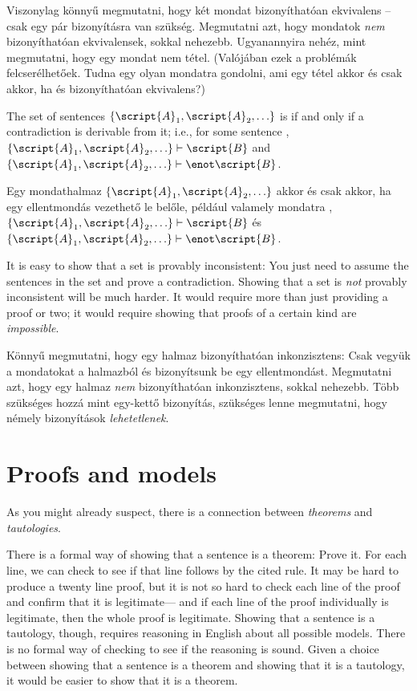 Viszonylag könnyű megmutatni, hogy két mondat bizonyíthatóan ekvivalens -- csak egy pár bizonyításra van szükség. Megmutatni azt, hogy mondatok \emph{nem} bizonyíthatóan ekvivalensek, sokkal nehezebb. Ugyanannyira nehéz, mint megmutatni, hogy egy mondat nem tétel. (Valójában ezek a problémák felcserélhetőek. Tudna egy olyan mondatra gondolni, ami egy tétel akkor és csak akkor, ha  és  bizonyíthatóan ekvivalens?)

The set of sentences $\{\script{A}_1,\script{A}_2,\ldots\}$ is  if and only if a contradiction is derivable from it; i.e., for some sentence , $\{\script{A}_1,\script{A}_2,\ldots\}\vdash\script{B}$ and $\{\script{A}_1,\script{A}_2,\ldots\}\vdash\enot \script{B}$.

Egy mondathalmaz $\{\script{A}_1,\script{A}_2,\ldots\}$  akkor és csak akkor, ha egy ellentmondás vezethető le belőle, például valamely mondatra , $\{\script{A}_1,\script{A}_2,\ldots\}\vdash\script{B}$ és $\{\script{A}_1,\script{A}_2,\ldots\}\vdash\enot \script{B}$.

It is easy to show that a set is provably inconsistent: You just need to assume the sentences in the set and prove a contradiction. Showing that a set is \emph{not} provably inconsistent will be much harder. It would require more than just providing a proof or two; it would require showing that proofs of a certain kind are \emph{impossible}.

Könnyű megmutatni, hogy egy halmaz bizonyíthatóan inkonzisztens: Csak vegyük a mondatokat a halmazból és bizonyítsunk be egy ellentmondást. Megmutatni azt, hogy egy halmaz \emph{nem} bizonyíthatóan inkonzisztens, sokkal nehezebb. Több szükséges hozzá mint egy-kettő bizonyítás, szükséges lenne megmutatni, hogy némely bizonyítások \emph{lehetetlenek}.






\section{Proofs and models}
As you might already suspect, there is a connection between \emph{theorems} and \emph{tautologies}.

There is a formal way of showing that a sentence is a theorem: Prove it. For each line, we can check to see if that line follows by the cited rule. It may be hard to produce a twenty line proof, but it is not so hard to check each line of the proof and confirm that it is legitimate--- and if each line of the proof individually is legitimate, then the whole proof is legitimate. Showing that a sentence is a tautology, though, requires reasoning in English about all possible models. There is no formal way of checking to see if the reasoning is sound. Given a choice between showing that a sentence is a theorem and showing that it is a tautology, it would be easier to show that it is a theorem.

